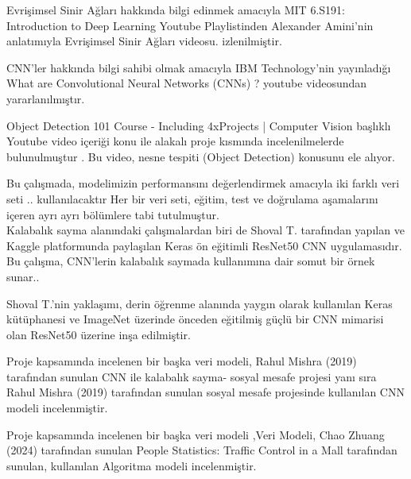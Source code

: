 \documentclass[10pt,a4paper]{report}
\begin{document}
	Evrişimsel Sinir Ağları hakkında bilgi edinmek amacıyla  MIT 6.S191: Introduction to Deep Learning Youtube Playlistinden  Alexander Amini'nin anlatımıyla  Evrişimsel Sinir Ağları videosu\cite{amini2022cnnvideo}. izlenilmiştir.\newline
	
	CNN'ler hakkında bilgi sahibi olmak amacıyla IBM Technology'nin yayınladığı  What are Convolutional Neural Networks (CNNs) ?\cite{cnnvideo}  youtube videosundan yararlanılmıştır.\newline
	
	
	Object Detection 101 Course - Including 4xProjects | Computer Vision başlıklı \cite{Computer_Vision} Youtube video içeriği konu ile alakalı proje kısmında incelenilmelerde bulunulmuştur  . Bu video,  nesne tespiti (Object Detection) konusunu ele alıyor.
	
	Bu çalışmada, modelimizin performansını değerlendirmek amacıyla iki farklı veri seti
	 \cite{CrowdCounting_dataset1}.\cite{CrowdCounting_dataset2}.   kullanılacaktır   Her bir veri seti, eğitim, test ve doğrulama aşamalarını içeren ayrı ayrı bölümlere tabi tutulmuştur.\newline
	\\
	Kalabalık sayma alanındaki  çalışmalardan biri de Shoval T. tarafından yapılan ve Kaggle platformunda paylaşılan Keras ön eğitimli ResNet50 CNN uygulamasıdır. Bu çalışma, CNN'lerin kalabalık saymada kullanımına dair somut bir örnek sunar\cite{shovalt2018crowdcounting}.. \newline
	
	Shoval T.'nin yaklaşımı, derin öğrenme alanında yaygın olarak kullanılan Keras kütüphanesi ve ImageNet üzerinde önceden eğitilmiş güçlü bir CNN mimarisi olan ResNet50 üzerine inşa edilmiştir.\newline
	
	\clearpage
	Proje kapsamında incelenen bir başka veri modeli, Rahul Mishra (2019) tarafından sunulan CNN ile kalabalık sayma- sosyal mesafe \cite{RahulMishra} projesi yanı sıra Rahul Mishra (2019) tarafından sunulan sosyal mesafe projesinde kullanılan CNN modeli incelenmiştir.\newline
	
		
	Proje kapsamında incelenen bir başka veri modeli ,Veri Modeli, Chao Zhuang (2024) tarafından sunulan People Statistics: Traffic Control in a Mall \cite{ChaoZhuang}  tarafından sunulan, kullanılan Algoritma  modeli incelenmiştir.	\newline
	
\end{document}
